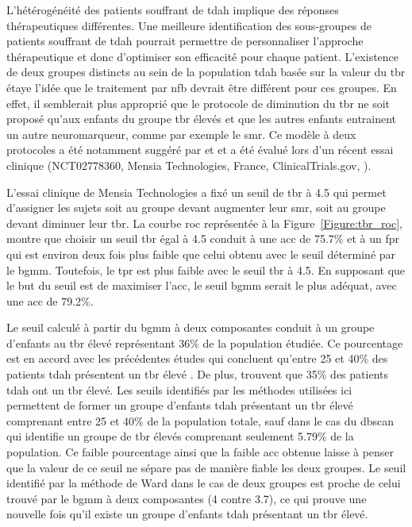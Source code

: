 L'hétérogénéité des patients souffrant de \gls{tdah} implique des réponses thérapeutiques différentes. Une meilleure identification des sous-groupes de patients souffrant de 
\gls{tdah} pourrait permettre de personnaliser l'approche thérapeutique et donc d'optimiser son efficacité pour chaque patient. L'existence de deux groupes distincts au sein de la 
population \gls{tdah} basée sur la valeur du \gls{tbr} étaye l'idée que le traitement par \gls{nfb} devrait être différent pour ces groupes. En effet, il semblerait
plus approprié que le protocole de diminution du \gls{tbr} ne soit proposé qu'aux enfants du groupe \gls{tbr} élevés et que les autres enfants entrainent un autre
neuromarqueur, comme par exemple le \gls{smr}. Ce modèle à deux protocoles a été notamment suggéré par \citet{Kerson2013} et \citet{Arns2012} et a été évalué lors 
d'un récent essai clinique (NCT02778360, Mensia Technologies, France, ClinicalTrials.gov, \citep{Bioulac2019}).

L'essai clinique de Mensia Technologies a fixé un seuil de \gls{tbr} à 4.5 qui permet d'assigner les sujets soit au groupe devant augmenter leur \gls{smr}, soit 
au groupe devant diminuer leur \gls{tbr}. La courbe \gls{roc} représentée à la Figure~\ref{Figure:tbr_roc}, montre que choisir un seuil \gls{tbr} égal à 4.5 conduit
à une \gls{acc} de 75.7\% et à un \gls{fpr} qui est environ deux fois plus faible que celui obtenu avec le seuil déterminé par le \gls{bgmm}. Toutefois, 
le \gls{tpr} est plus faible avec le seuil \gls{tbr} à 4.5. En supposant que le but du seuil est de maximiser l'\gls{acc}, le seuil \gls{bgmm} serait le 
plus adéquat, avec une \gls{acc} de 79.2\%.

Le seuil calculé à partir du \gls{bgmm} à deux composantes conduit à un groupe d'enfants au \gls{tbr} élevé représentant 36\% de la population étudiée. 
Ce pourcentage est en accord avec les précédentes études qui concluent qu'entre 25 et 40\% des patients \gls{tdah} présentent un \gls{tbr} élevé \citep{Arns2012}. 
De plus,\citet{Clarke2011} trouvent que 35\% des patients \gls{tdah} ont un \gls{tbr} élevé. 
Les seuils identifiés par les méthodes utilisées ici permettent de former un groupe d'enfants \gls{tdah} présentant un \gls{tbr} élevé comprenant entre
25 et 40\% de la population totale, sauf dans le cas du \gls{dbscan} qui identifie un groupe
de \gls{tbr} élevés comprenant seulement 5.79\% de la population. Ce faible pourcentage ainsi que la faible \gls{acc} obtenue laisse à penser
que la valeur de ce seuil ne sépare pas de manière fiable les deux groupes. Le seuil identifié par la méthode de Ward dans le cas de deux groupes
est proche de celui trouvé par le \gls{bgmm} à deux composantes (4 contre 3.7), ce qui prouve une nouvelle fois qu'il existe un groupe d'enfants \gls{tdah}
présentant un \gls{tbr} élevé.

